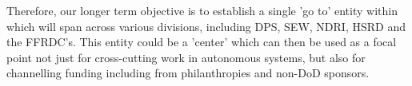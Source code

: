 \documentclass[11pt,letterpaper]{article}
\begin{document}
Therefore, our longer term objective is to establish a single 'go to' entity within \org
which will span across various divisions, including DPS, SEW, NDRI,
HSRD and the FFRDC's. This entity could be a 'center' which can then
be used as a focal point not just for cross-cutting work in autonomous
systems, but also for channelling funding including from philanthropies
and non-DoD sponsors.
\end{document}
